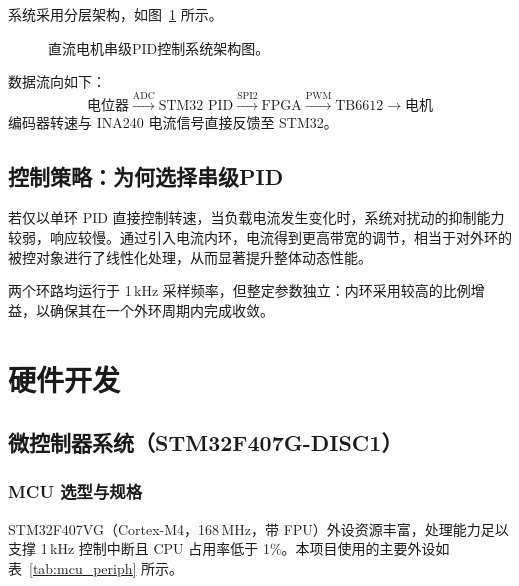 \documentclass[12pt, a4paper]{ctexrep}
\begin{document}
系统采用分层架构，如图~\ref{fig:arch} 所示。

\begin{figure}[H]
    \centering
    \caption{直流电机串级PID控制系统架构图。}
    \label{fig:arch}
\end{figure}

数据流向如下：
\[
\text{电位器} \xrightarrow{\text{ADC}} \text{STM32 PID}
\xrightarrow{\text{SPI2}} \text{FPGA} \xrightarrow{\text{PWM}}
\text{TB6612} \rightarrow \text{电机}
\]
编码器转速与 INA240 电流信号直接反馈至 STM32。

\section{控制策略：为何选择串级PID}

若仅以单环 PID 直接控制转速，当负载电流发生变化时，系统对扰动的抑制能力较弱，响应较慢。通过引入电流内环，电流得到更高带宽的调节，相当于对外环的被控对象进行了线性化处理，从而显著提升整体动态性能。

两个环路均运行于 1\,kHz 采样频率，但整定参数独立：内环采用较高的比例增益，以确保其在一个外环周期内完成收敛。

\chapter{硬件开发}

\section{微控制器系统（STM32F407G-DISC1）}

\subsection{MCU 选型与规格}

STM32F407VG（Cortex-M4，168\,MHz，带 FPU）外设资源丰富，处理能力足以支撑 1\,kHz 控制中断且 CPU 占用率低于 1\%。本项目使用的主要外设如表~\ref{tab:mcu_periph} 所示。
\end{document}
